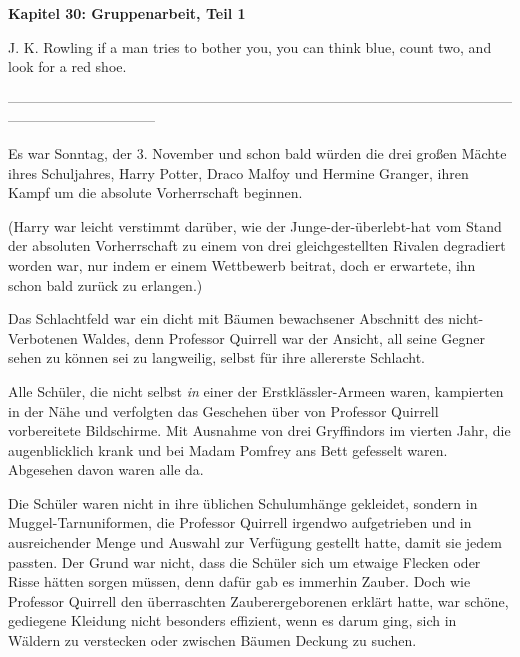 

\hypertarget{gruppenarbeit-teil-1}{%

\textbf{Kapitel 30: Gruppenarbeit, Teil 1\\ }

\hfill\break J. K. Rowling if a man tries to bother you, you can think blue, count two, and look for a red shoe.

--------------------------------------------------------------------------------------------------------------------------------------------

\hfill\break Es war Sonntag, der 3. November und schon bald würden die drei großen Mächte ihres Schuljahres, Harry Potter, Draco Malfoy und Hermine Granger, ihren Kampf um die absolute Vorherrschaft beginnen.

(Harry war leicht verstimmt darüber, wie der Junge-der-überlebt-hat vom Stand der absoluten Vorherrschaft zu einem von drei gleichgestellten Rivalen degradiert worden war, nur indem er einem Wettbewerb beitrat, doch er erwartete, ihn schon bald zurück zu erlangen.)

Das Schlachtfeld war ein dicht mit Bäumen bewachsener Abschnitt des nicht-Verbotenen Waldes, denn Professor Quirrell war der Ansicht, all seine Gegner sehen zu können sei zu langweilig, selbst für ihre allererste Schlacht.

Alle Schüler, die nicht selbst \emph{in} einer der Erstklässler-Armeen waren, kampierten in der Nähe und verfolgten das Geschehen über von Professor Quirrell vorbereitete Bildschirme. Mit Ausnahme von drei Gryffindors im vierten Jahr, die augenblicklich krank und bei Madam Pomfrey ans Bett gefesselt waren. Abgesehen davon waren alle da.

Die Schüler waren nicht in ihre üblichen Schulumhänge gekleidet, sondern in Muggel-Tarnuniformen, die Professor Quirrell irgendwo aufgetrieben und in ausreichender Menge und Auswahl zur Verfügung gestellt hatte, damit sie jedem passten. Der Grund war nicht, dass die Schüler sich um etwaige Flecken oder Risse hätten sorgen müssen, denn dafür gab es immerhin Zauber. Doch wie Professor Quirrell den überraschten Zauberergeborenen erklärt hatte, war schöne, gediegene Kleidung nicht besonders effizient, wenn es darum ging, sich in Wäldern zu verstecken oder zwischen Bäumen Deckung zu suchen.

}
